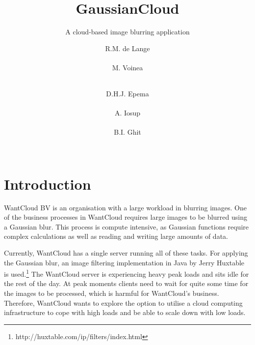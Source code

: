 \documentclass{acm_proc_article-sp}
\begin{document}
\title{GaussianCloud}
\subtitle{A cloud-based image blurring application}

\author{
\alignauthor
R.M. de Lange\\
		\\
\alignauthor
M. Voinea\\
		\\
\and
\alignauthor
D.H.J. Epema\\
		\\
\alignauthor
A. Iosup\\
		\\
\alignauthor
B.I. Ghit\\
		\\
}

\maketitle

\begin{abstract}
\end{abstract}

\section{Introduction}
\label{sec:intro}
WantCloud BV is an organisation with a large workload in blurring images.
One of the business processes in WantCloud requires large images to be blurred using a Gaussian blur.
This process is compute intensive, as Gaussian functions require complex calculations as well as reading and writing large amounts of data.

Currently, WantCloud has a single server running all of these tasks.
For applying the Gaussian blur, an image filtering implementation in Java by Jerry Huxtable is used.\footnote{http://huxtable.com/ip/filters/index.html}
The WantCloud server is experiencing heavy peak loads and sits idle for the rest of the day.
At peak moments clients need to wait for quite some time for the images to be processed, which is harmful for WantCloud's business.
Therefore, WantCloud wants to explore the option to utilise a cloud computing infrastructure to cope with high loads and be able to scale down with low loads.
\end{document}
